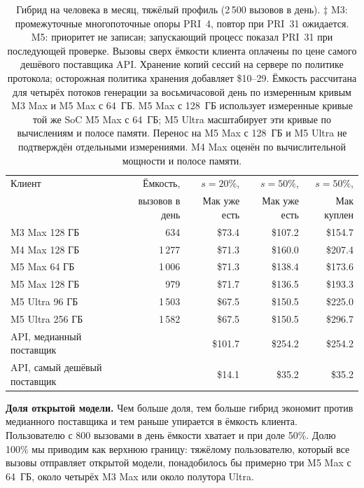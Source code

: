 \begin{table}[t]
\centering
\caption{Гибрид на человека в месяц, тяжёлый профиль (2\,500 вызовов в день). ‡ M3: промежуточные многопоточные опоры PRI~4, повтор при PRI~31 ожидается. M5: приоритет не записан; запускающий процесс показал PRI~31 при последующей проверке. Вызовы сверх ёмкости клиента оплачены
по цене самого дешёвого поставщика API. Хранение копий сессий на сервере по политике протокола; осторожная политика
хранения добавляет \$10--29. Ёмкость рассчитана для четырёх потоков генерации за восьмичасовой день
по измеренным кривым M3 Max и M5 Max с 64~ГБ. M5 Max с 128~ГБ использует измеренные кривые той же SoC M5 Max с 64~ГБ;
M5 Ultra масштабирует эти кривые по вычислениям и полосе памяти. Перенос на M5 Max с 128~ГБ и M5 Ultra
не подтверждён отдельными измерениями. M4 Max оценён по вычислительной мощности и полосе памяти.}
\label{tab:econ}
\footnotesize
\begin{tabular}{lrrrr}
\toprule
Клиент & Ёмкость, & $s = 20\%$, & $s = 50\%$, & $s = 50\%$, \\
 & вызовов в день & Мак уже есть & Мак уже есть & Мак куплен \\
\midrule
M3 Max 128 ГБ & 634 & \$73.4 & \$107.2 & \$154.7 \\
M4 Max 128 ГБ & 1\,277 & \$71.3 & \$160.0 & \$207.4 \\
M5 Max 64 ГБ & 1\,006 & \$71.3 & \$138.4 & \$173.6 \\
M5 Max 128 ГБ & 979 & \$71.7 & \$136.5 & \$193.3 \\
M5 Ultra 96 ГБ & 1\,503 & \$67.5 & \$150.5 & \$225.0 \\
M5 Ultra 256 ГБ & 1\,582 & \$67.5 & \$150.5 & \$296.7 \\
\midrule
API, медианный поставщик & & \$101.7 & \$254.2 & \$254.2 \\
API, самый дешёвый поставщик & & \$14.1 & \$35.2 & \$35.2 \\
\bottomrule
\end{tabular}
\end{table}

\textbf{Доля открытой модели.} Чем больше доля, тем больше гибрид экономит против медианного поставщика и тем раньше
упирается в ёмкость клиента. Пользователю с 800 вызовами в день ёмкости хватает и при доле 50\%. Долю 100\% мы
приводим как верхнюю границу: тяжёлому пользователю, который все вызовы отправляет открытой модели, понадобилось бы примерно три M5 Max с 64~ГБ, около четырёх M3 Max или около полутора Ultra.

